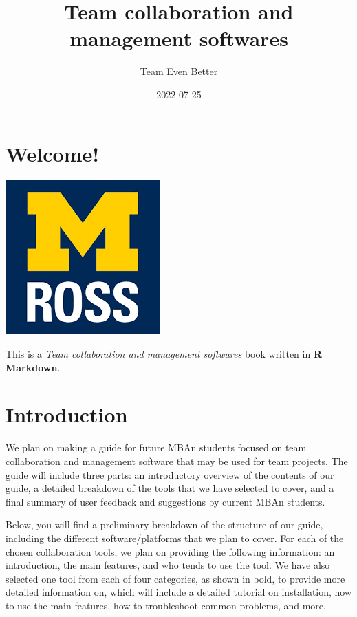 \documentclass[
]{book}
\title{Team collaboration and management softwares}
\author{Team Even Better}
\date{2022-07-25}
\begin{document}
\maketitle

{
\setcounter{tocdepth}{1}
\tableofcontents
}
\hypertarget{welcome}{%
\chapter{Welcome!}\label{welcome}}

\includegraphics{Ross_School_of_Business_logo.png}

This is a \emph{Team collaboration and management softwares} book written in \textbf{R Markdown}.

\hypertarget{introduction}{%
\chapter{Introduction}\label{introduction}}

We plan on making a guide for future MBAn students focused on team collaboration and management software that may be used for team projects. The guide will include three parts: an introductory overview of the contents of our guide, a detailed breakdown of the tools that we have selected to cover, and a final summary of user feedback and suggestions by current MBAn students.

Below, you will find a preliminary breakdown of the structure of our guide, including the different software/platforms that we plan to cover. For each of the chosen collaboration tools, we plan on providing the following information: an introduction, the main features, and who tends to use the tool. We have also selected one tool from each of four categories, as shown in bold, to provide more detailed information on, which will include a detailed tutorial on installation, how to use the main features, how to troubleshoot common problems, and more.
\end{document}
